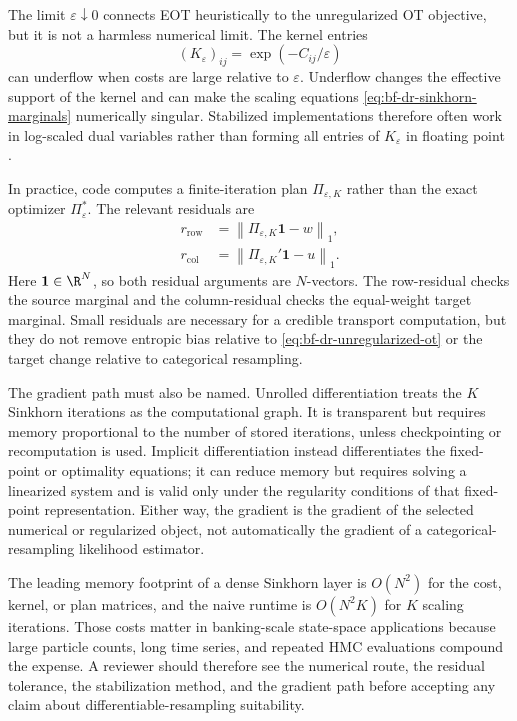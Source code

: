 The limit $\varepsilon\downarrow0$ connects EOT heuristically to the
unregularized OT objective, but it is not a harmless numerical limit.  The
kernel entries
\[
  (K_\varepsilon)_{ij}=\exp(-C_{ij}/\varepsilon)
\]
can underflow when costs are large relative to $\varepsilon$.  Underflow changes
the effective support of the kernel and can make the scaling equations
\eqref{eq:bf-dr-sinkhorn-marginals} numerically singular.  Stabilized
implementations therefore often work in log-scaled dual variables rather than
forming all entries of $K_\varepsilon$ in floating point
\citep{schmitzer2019stabilized}.

In practice, code computes a finite-iteration plan
$\Pi_{\varepsilon,K}$ rather than the exact optimizer
$\Pi_\varepsilon^*$.  The relevant residuals are
\begin{align}
\label{eq:bf-dr-sinkhorn-residuals}
  r_{\mathrm{row}}
  &= \left\|\Pi_{\varepsilon,K}\mathbf 1 - w\right\|_1,\\
  r_{\mathrm{col}}
  &= \left\|\Pi_{\varepsilon,K}'\mathbf 1 - u\right\|_1 .
\end{align}
Here $\mathbf1\in\R^N$, so both residual arguments are $N$-vectors.  The
row-residual checks the source marginal and the column-residual checks the
equal-weight target marginal.
Small residuals are necessary for a credible transport computation, but they do
not remove entropic bias relative to \eqref{eq:bf-dr-unregularized-ot} or the
target change relative to categorical resampling.

The gradient path must also be named.  Unrolled differentiation treats the
$K$ Sinkhorn iterations as the computational graph.  It is transparent but
requires memory proportional to the number of stored iterations, unless
checkpointing or recomputation is used.  Implicit differentiation instead
differentiates the fixed-point or optimality equations; it can reduce memory
but requires solving a linearized system and is valid only under the regularity
conditions of that fixed-point representation.  Either way, the gradient is the
gradient of the selected numerical or regularized object, not automatically the
gradient of a categorical-resampling likelihood estimator.

The leading memory footprint of a dense Sinkhorn layer is $O(N^2)$ for the cost,
kernel, or plan matrices, and the naive runtime is $O(N^2K)$ for $K$ scaling
iterations.  Those costs matter in banking-scale state-space applications
because large particle counts, long time series, and repeated HMC evaluations
compound the expense.  A reviewer should therefore see the numerical route,
the residual tolerance, the stabilization method, and the gradient path before
accepting any claim about differentiable-resampling suitability.

